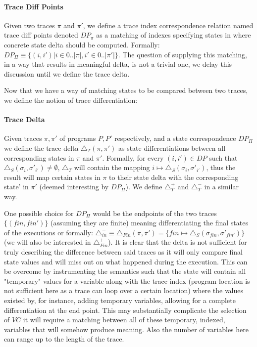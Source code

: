 \paragraph{Trace Diff Points} 
Given two traces $\pi$ and $\pi'$, we define a trace index correspondence relation named trace diff points denoted $DP_{\pi}$ as a matching of indexes specifying states in where concrete state delta should be computed. Formally: $DP_{\Pi} \equiv \{(i,i')|i \in {0..|\pi|}, i' \in {0..|\pi'|}\}$. The question of supplying this matching, in a way that results in meaningful delta, is not a trivial one, we delay this discussion until we define the trace delta.

Now that we have a way of matching states to be compared between two traces, we define the notion of trace differentiation:

\paragraph{Trace Delta} 
Given traces $\pi,\pi'$ of programs $P,P'$ respectively, and a state correspondence $DP_{\Pi}$ we define the trace delta $\triangle_{T}(\pi,\pi')$ as state differentiations between all corresponding states in $\pi$ and $\pi'$. Formally, for every $(i,i') \in DP$ such that $\triangle_{S}(\sigma_{i},\sigma'_{i'}) \neq \emptyset$, $\triangle_{T}$ will contain the mapping $i \mapsto \triangle_{S}(\sigma_{i},\sigma'_{i'})$, thus the result will map certain states in $\pi$ to their state delta with the corresponding state' in $\pi'$ (deemed interesting by $DP_{\Pi}$). We define $\triangle_{T}^{+}$ and $\triangle_{T}^{-}$ in a similar way.

One possible choice for $DP_{\Pi}$ would be the endpoints of the two traces $\{(fin,fin')\}$ (assuming they are finite) meaning differentiating the final states of the executions or formally: $\triangle_{in}^{-} \equiv \triangle_{Fin}(\pi,\pi') = \{fin\mapsto\triangle_{S}(\sigma_{fin},\sigma'_{fin'})\}$ (we will also be interested in $\triangle_{Fin}^{+}$). It is clear that the delta is not sufficient for truly describing the difference between said traces as it will only compare final state values and will miss out on what happened during the execution. This can be overcome by instrumenting the semantics such that the state will contain all "temporary" values for a variable along with the trace index (program location is not sufficient here as a trace can loop over a certain location) where the values existed by, for instance, adding temporary variables, allowing for a complete differentiation at the end point. This may substantially complicate the selection of $VC$ it will require a matching between all of these temporary, indexed, variables that will somehow produce meaning. Also the number of variables here can range up to the length of the trace.

